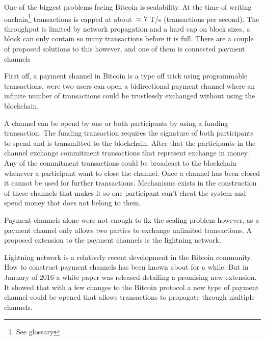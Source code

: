 
One of the biggest problems facing Bitcoin is scalability. At the time of writing
onchain\footnote{See glossary} transactions is capped at about $\approx 7$ T/s (transactions per second).\cite{scaling}
The throughput is limited by network propagation and a hard cap on block sizes, a block
can only contain so many transactions before it is full. There are a couple of
proposed solutions to this however, and one of them is connected payment channels

First off, a payment channel in Bitcoin is a type off trick using programmable transactions, 
were two users can open a bidirectional payment channel where an infinite number of transactions 
could be trustlessly exchanged without using the blockchain. 

A channel can be opend by one or both participants by using a funding transaction. The funding 
transaction requires the signature of both participants to spend and is transmitted to the blockchain. 
After that the participants in the channel exchange commitment transactions that represent exchange in money.
Any of the commitment transactions could be broadcast to the blockchain whenever a participant 
want to close the channel. Once a channel has been closed it cannot be used for further transactions.
Mechanisms exists in the construction of these channels that makes it so one participant 
can't cheat the system and spend money that does not belong to them.

Payment channels alone were not enough to fix the scaling problem however, as a payment channel 
only allows two parties to exchange unlimited transactions. A proposed extension to the 
payment channels is the lightning network.

Lightning network is a relatively recent development in the Bitcoin community.
How to construct payment channels has been known about for a while. But in
January of 2016 a white paper was released detailing a promising new extension.\cite{lightningnetwork_2019}
It showed that with a few changes to the Bitcoin protocol a new type of
payment channel could be opened that allows transactions to propagate through multiple channels.\cite{lightningnetwork_2019}

